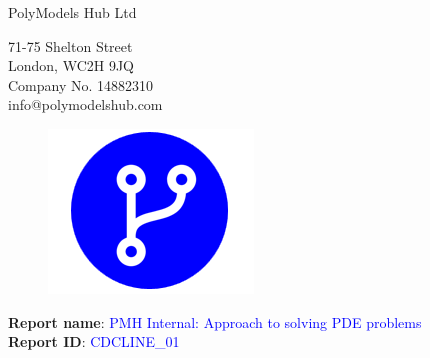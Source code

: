 \documentclass{article}
\begin{document}
\thispagestyle{firstpage}
\vspace*{-0.9cm}
\begin{minipage}{0.9\textwidth}
    {\huge \color{blue} PolyModels Hub Ltd}
    \\
    \vspace{-0.15cm}

    71-75 Shelton Street
    \\
    London, WC2H 9JQ
    \\
    Company No. 14882310
    \\
    info@polymodelshub.com
    \\
\end{minipage}
\begin{minipage}{0.115\textwidth}
    \begin{figure}[H]
        \vspace{-0.5cm}\includegraphics[width=\textwidth]{PMHlogo.png}
    \end{figure}
\end{minipage}
\vspace{0.5cm}

\begin{minipage}{1\textwidth}
    \textbf{Report name}: \textcolor{blue}{ \large PMH Internal: Approach to solving PDE problems} \\
    \textbf{Report ID}: \textcolor{blue}{ CDCLINE\_01 }\\

\end{minipage}%

\vspace{0.0cm}
\end{document}
